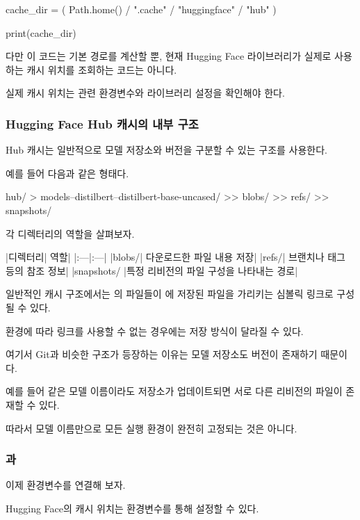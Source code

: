 \begin{dhkcode}
cache_dir = (
    Path.home()
    / ".cache"
    / "huggingface"
    / "hub"
)

print(cache_dir)
\end{dhkcode}

다만 이 코드는 기본 경로를 계산할 뿐, 현재 Hugging Face 라이브러리가 실제로 사용하는 캐시 위치를 조회하는 코드는 아니다.

실제 캐시 위치는 관련 환경변수와 라이브러리 설정을 확인해야 한다.

\subsubsection{Hugging Face Hub 캐시의 내부 구조}

Hub 캐시는 일반적으로 모델 저장소와 버전을 구분할 수 있는 구조를 사용한다.

예를 들어 다음과 같은 형태다.

\begin{dhkdir}[in=2]
hub/
> models--distilbert--distilbert-base-uncased/
>> blobs/
>> refs/
>> snapshots/
\end{dhkdir}

각 디렉터리의 역할을 살펴보자.

\begin{dhktable}
|디렉터리|	역할|
|:---|:---|
|blobs/|	다운로드한 파일 내용 저장|
|refs/|	브랜치나 태그 등의 참조 정보|
|snapshots/	|특정 리비전의 파일 구성을 나타내는 경로|
\end{dhktable}

일반적인 캐시 구조에서는 의 파일들이 에 저장된 파일을 가리키는 심볼릭 링크로 구성될 수 있다.

환경에 따라 링크를 사용할 수 없는 경우에는 저장 방식이 달라질 수 있다.

여기서 Git과 비슷한 구조가 등장하는 이유는 모델 저장소도 버전이 존재하기 때문이다.

예를 들어 같은 모델 이름이라도 저장소가 업데이트되면 서로 다른 리비전의 파일이 존재할 수 있다.

따라서 모델 이름만으로 모든 실행 환경이 완전히 고정되는 것은 아니다.

\subsubsection{과 }

이제 환경변수를 연결해 보자.

Hugging Face의 캐시 위치는 환경변수를 통해 설정할 수 있다.

